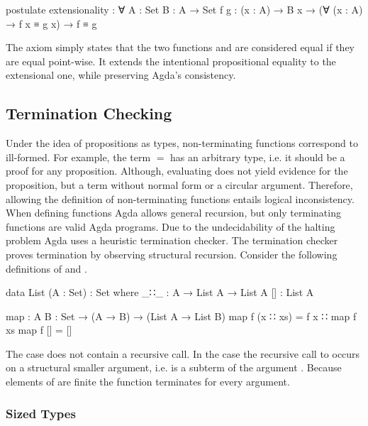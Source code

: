 \begin{code}
postulate
  extensionality : ∀ {A : Set} {B : A → Set} 
    {f g : (x : A) → B x} → (∀ (x : A) → f x ≡ g x) → f ≡ g
\end{code}
The axiom simply states that the two functions  and
 are considered equal if they are equal point-wise.
It extends the intentional propositional equality to the extensional one, while
preserving Agda's consistency.


\subsection{Termination Checking}
\label{sec:termination-checking}

Under the idea of propositions as types, non-terminating functions correspond to
ill-formed.
For example, the term
\AgdaSpace{}$=$\AgdaSpace{} has an
arbitrary type, i.e. it should be a proof for any proposition.
Although, evaluating  does not yield evidence for the
proposition, but a term without normal form or a circular argument.
Therefore, allowing the definition of non-terminating functions entails logical
inconsistency.
When defining functions Agda allows general recursion, but only terminating
functions are valid Agda programs.
Due to the undecidability of the halting problem Agda uses a heuristic
termination checker.
The termination checker proves termination by observing structural recursion.
Consider the following definitions of  and
.

\begin{code}
data List (A : Set) : Set where
  _∷_  : A → List A → List A
  []   : List A

map : {A B : Set} → (A → B) → (List A → List B)
map f (x ∷ xs)  = f x ∷ map f xs
map f []        = []
\end{code}
The \AgdaInductiveConstructor{[]} case does not contain a recursive call.
In the  case the recursive call to
 occurs on a structural smaller argument, i.e.
 is a subterm of the argument
\;\;.
Because elements of  are finite the function
 terminates for every argument.


\subsubsection{Sized Types}
\label{preliminaries:sized-types}

